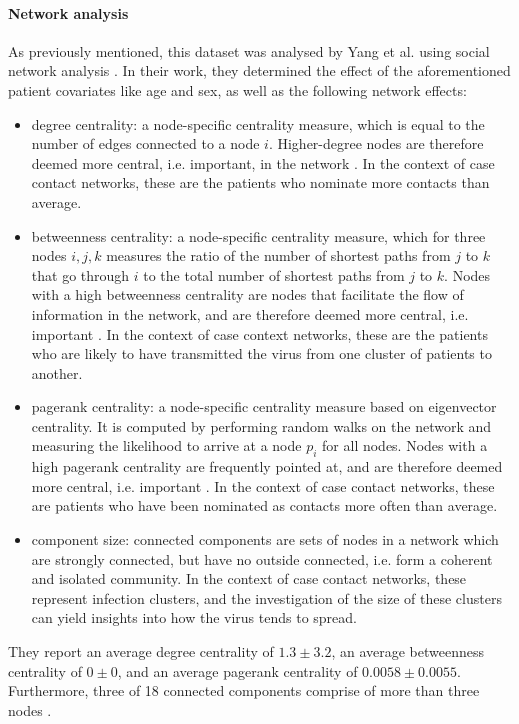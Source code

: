 \paragraph{Network analysis}
As previously mentioned, this dataset was analysed by Yang et al. using social network analysis \cite{hainan_publication}. In their work, they determined the effect of the aforementioned patient covariates like age and sex, as well as the following network effects:
\begin{itemize}
	\item degree centrality: a node-specific centrality measure, which is equal to the number of edges connected to a node $i$. Higher-degree nodes are therefore deemed more central, i.e. important, in the network \cite{golbeck}. In the context of case contact networks, these are the patients who nominate more contacts than average.
	\item betweenness centrality: a node-specific centrality measure, which for three nodes $i,j,k$ measures the ratio of the number of shortest paths from $j$ to $k$ that go through $i$ to the total number of shortest paths from $j$ to $k$. Nodes with a high betweenness centrality are nodes that facilitate the flow of information in the network, and are therefore deemed more central, i.e. important \cite{golbeck}. In the context of case context networks, these are the patients who are likely to have transmitted the virus from one cluster of patients to another.
	\item pagerank centrality: a node-specific centrality measure based on eigenvector centrality. It is computed by performing random walks on the network and measuring the likelihood to arrive at a node $p_i$ for all nodes. Nodes with a high pagerank centrality are frequently pointed at, and are therefore deemed more central, i.e. important \cite{gleich_pagerank}. In the context of case contact networks, these are patients who have been nominated as contacts more often than average.
	\item component size: connected components are sets of nodes in a network which are strongly connected, but have no outside connected, i.e. form a coherent and isolated community. In the context of case contact networks, these represent infection clusters, and the investigation of the size of these clusters can yield insights into how the virus tends to spread.
\end{itemize} They report an average degree centrality of $1.3\pm3.2$, an average betweenness centrality of $0\pm0$, and an average pagerank centrality of $0.0058\pm0.0055$. Furthermore, three of 18 connected components comprise of more than three nodes \cite{hainan_publication}. 

